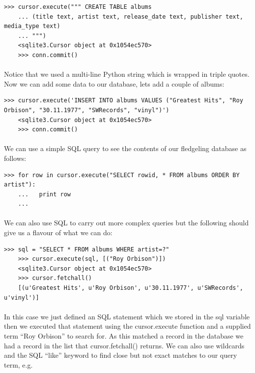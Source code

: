\documentclass[12pt, a4paper, oneside]{book}
\begin{document}
\begin{lstlisting}[style=DOS]
    >>> cursor.execute(""" CREATE TABLE albums
    ... (title text, artist text, release_date text, publisher text, media_type text)
    ... """)
    <sqlite3.Cursor object at 0x1054ec570>
    >>> conn.commit()
\end{lstlisting}

\paragraph{} Notice that we used a multi-line Python string which is wrapped in triple quotes. Now we can add some data to our database, lets add a couple of albums:

\begin{lstlisting}[style=DOS]
    >>> cursor.execute('INSERT INTO albums VALUES ("Greatest Hits", "Roy Orbison", "30.11.1977", "SWRecords", "vinyl")')
    <sqlite3.Cursor object at 0x1054ec570>
    >>> conn.commit()
\end{lstlisting}

\paragraph{} We can use a simple SQL query to see the contents of our fledgeling database as follows:

\begin{lstlisting}[style=DOS]
    >>> for row in cursor.execute("SELECT rowid, * FROM albums ORDER BY artist"):
    ...   print row
    ...
\end{lstlisting}

\paragraph{} We can also use SQL to carry out more complex queries but the following should give us a flavour of what we can do:

\begin{lstlisting}[style=DOS]
    >>> sql = "SELECT * FROM albums WHERE artist=?"
    >>> cursor.execute(sql, [("Roy Orbison")])
    <sqlite3.Cursor object at 0x1054ec570>
    >>> cursor.fetchall()
    [(u'Greatest Hits', u'Roy Orbison', u'30.11.1977', u'SWRecords', u'vinyl')]
\end{lstlisting}

\paragraph{} In this case we just defined an SQL statement which we stored in the sql variable then we executed that statement using the cursor.execute function and a supplied term ``Roy Orbison'' to search for. As this matched a record in the database we had a record in the list that cursor.fetchall() returns. We can also use wildcards and the SQL ``like'' keyword to find close but not exact matches to our query term, e.g.
\end{document}

